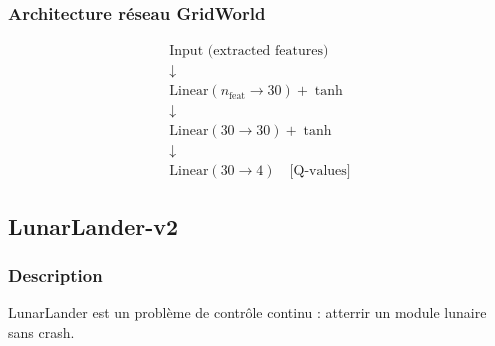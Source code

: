 \documentclass[12pt,a4paper]{article}
\begin{document}
\subsubsection{Architecture réseau GridWorld}

\[
\begin{array}{c}
\text{Input (extracted features)} \\
\downarrow \\
\text{Linear}(n_{\text{feat}} \to 30) + \tanh \\
\downarrow \\
\text{Linear}(30 \to 30) + \tanh \\
\downarrow \\
\text{Linear}(30 \to 4) \quad \text{[Q-values]}
\end{array}
\]

\subsection{LunarLander-v2}

\subsubsection{Description}

LunarLander est un problème de contrôle continu : atterrir un module lunaire sans crash.
\end{document}
